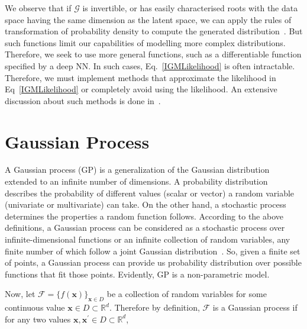 We observe that if $\mathcal{G}$ is invertible, or has easily characterised roots with the data space having the same dimension as the latent space, we can apply the rules of transformation of probability density to compute the generated distribution~\cite{LearnIGM}. But such functions limit our capabilities of modelling more complex distributions. Therefore, we seek to use more general functions, such as a differentiable function specified by a deep NN. In such cases, Eq.~\ref{IGMLikelihood} is often intractable. Therefore, we must implement methods that approximate the likelihood in Eq~\ref{IGMLikelihood} or completely avoid using the likelihood. An extensive discussion about such methods is done in~\cite{LearnIGM}.


    

\section{Gaussian Process}\label{GP}
A Gaussian process (GP) is a generalization of the Gaussian distribution extended to an infinite number of dimensions. A probability distribution describes the probability of different values (scalar or vector) a random variable (univariate or multivariate) can take. On the other hand, a stochastic process determines the properties a random function follows. According to the above definitions, a Gaussian process can be considered as a stochastic process over infinite-dimensional functions or an infinite collection of random variables, any finite number of which follow a joint Gaussian distribution~\cite{GPML}. So, given a finite set of points, a Gaussian process can provide us probability distribution over possible functions that fit those points. Evidently, GP is a non-parametric model. 
\newline

Now, let $\mathcal{F}=\{f(\mathbf{x})\}_{\mathbf{x} \in D}$ be a collection of random variables for some continuous value $\mathbf{x} \in D \subset \mathbb{R}^d$. Therefore by definition, $\mathcal{F}$ is a Gaussian process if for any two values $\mathbf{x}, \mathbf{x}^{\prime} \in D \subset \mathbb{R}^d$,

